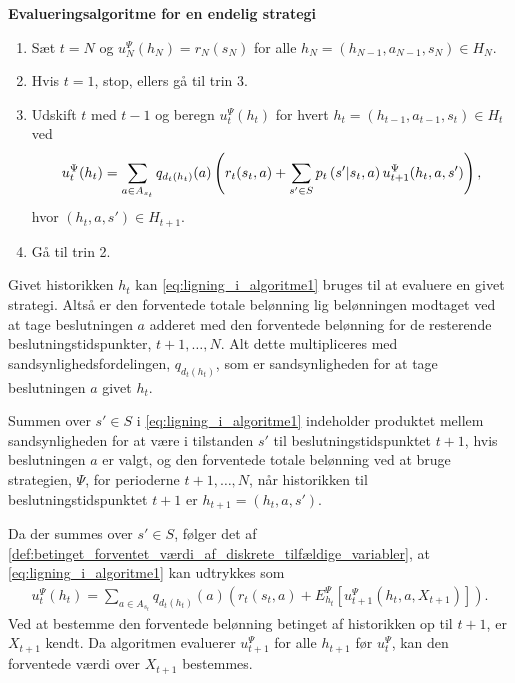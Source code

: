 \begin{alg} \textbf{Evalueringsalgoritme for en endelig strategi} \label{Algoritme1}%
\begin{enumerate}
    \item Sæt $t = N $ og $u_N^\Psi(h_N) = r_N(s_N)$ for alle $h_N = (h_{N-1}, a_{N-1}, s_N) \in H_N$.
    \item Hvis $t = 1$, stop, ellers gå til trin 3.
    \item Udskift $t$ med $t-1$ og beregn $u_t^\Psi(h_t)$ for hvert $h_t = (h_{t-1}, a_{t-1}, s_t)\in H_t$ ved \begin{align}\label{eq:ligning_i_algoritme1}
        \vspace{-0.5cm}u_t^\Psi(h_t) = \sum_{a \in A_{s_t}}q_{d_t(h_t)}(a)\left(r_t(s_t, a) + \sum_{s' \in S} p_t\left(s'|s_t,a\right)u_{t+1}^\Psi(h_t,a,s')\right),
    \end{align}
    hvor $(h_t, a ,s') \in H_{t+1}$.
    \item Gå til trin 2.
\end{enumerate}
\end{alg}

Givet historikken $h_t$ kan \eqref{eq:ligning_i_algoritme1} bruges til at evaluere en givet strategi. Altså er den forventede totale belønning lig belønningen modtaget ved at tage beslutningen $a$ adderet med den forventede belønning for de resterende beslutningstidspunkter, $t+1, \ldots, N$. Alt dette multipliceres med sandsynlighedsfordelingen, $q_{d_t(h_t)}$, som er sandsynligheden for at tage beslutningen $a$ givet $h_t$. 

Summen over $s' \in S$ i \eqref{eq:ligning_i_algoritme1} indeholder produktet mellem sandsynligheden for at være i tilstanden $s'$ til beslutningstidspunktet $t+1$, hvis beslutningen $a$ er valgt, og den forventede totale belønning ved at bruge strategien, $\Psi$, for perioderne $t+1, \ldots, N$, når historikken til beslutningstidspunktet $t+1$ er $h_{t+1} = (h_t, a, s')$. 

Da der summes over $s' \in S$, følger det af \autoref{def:betinget_forventet_værdi_af_diskrete_tilfældige_variabler}, at \eqref{eq:ligning_i_algoritme1} kan udtrykkes som 
\begin{align}\label{eq:algoritme_ligning_vol2}
    u_t^\Psi(h_t)=\sum_{a \in A_{s_t}}q_{d_t(h_t)}(a)\left(r_t\left(s_t,a\right)+E_{h_t}^\Psi\left[u_{t+1}^\Psi\left(h_t, a, X_{t+1}\right)\right]\right).
\end{align}
Ved at bestemme den forventede belønning betinget af historikken op til $t+1$, er $X_{t+1}$ kendt. Da algoritmen evaluerer $u^\Psi_{t+1}$ for alle $h_{t+1}$ før $u^\Psi_t$, kan den forventede værdi over $X_{t+1}$ bestemmes.


